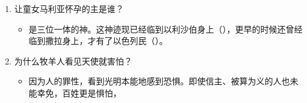 \begin{enumerate}
  \item \label{cpt1:que:1}让童女马利亚怀孕的主是谁？
  \begin{itemize}
    \item 是三位一体的神。这神迹现已经临到以利沙伯身上（），更早的时候还曾经临到撒拉身上，才有了以色列民（）。
  \end{itemize}
  \item \label{cpt1:que:2}为什么牧羊人看见天使就害怕？
  \begin{itemize}
    \item 因为人的罪性，看到光明本能地感到恐惧。即使信主、被算为义的人也未能幸免，百姓更是惧怕，
  \end{itemize}
\end{enumerate}

\renewcommand{\bibname}{本章参考}

